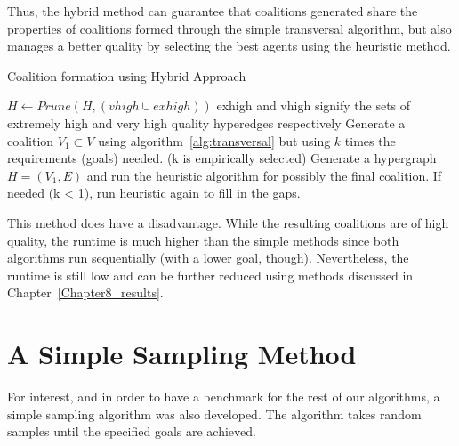 Thus, the hybrid method can guarantee that coalitions generated share the properties of coalitions formed through the simple transversal algorithm, but also manages a better quality by selecting the best agents using the heuristic method. 

\begin{algorithm}
	\caption{Coalition formation using Hybrid Approach}\label{alg:hybrid}
	\begin{algorithmic}[1]
		\State $H \gets Prune(H, (vhigh \cup exhigh))$ \Comment exhigh and vhigh signify the sets of extremely high and very high quality hyperedges respectively
		\State Generate a coalition $V_1 \subset V$ using algorithm~\ref{alg:transversal} but using $k$ times the requirements (goals) needed. (k is empirically selected)
		\State Generate a hypergraph $H = (V_1, E)$ and run the heuristic algorithm for possibly the final coalition.
		\State If needed (k < 1), run heuristic again to fill in the gaps. 
		
		\EndProcedure
	\end{algorithmic}
\end{algorithm}

This method does have a disadvantage. While the resulting coalitions are of high quality, the runtime is much higher than the simple methods since both algorithms run sequentially (with a lower goal, though). Nevertheless, the runtime is still low and can be further reduced using methods discussed in Chapter~\ref{Chapter8_results}.


\section{A Simple Sampling Method}
For interest, and in order to have a benchmark for the rest of our algorithms, a simple sampling algorithm was also developed. The algorithm takes random samples until the specified goals are achieved.
